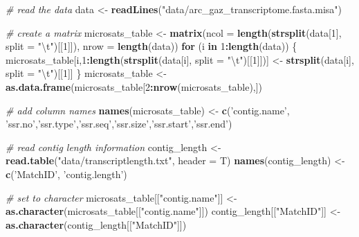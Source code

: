 \documentclass[]{article}
\newenvironment{Shaded}{\begin{snugshade}}{\end{snugshade}}
\newcommand{\KeywordTok}[1]{\textcolor[rgb]{0.13,0.29,0.53}{\textbf{#1}}}
\newcommand{\DataTypeTok}[1]{\textcolor[rgb]{0.13,0.29,0.53}{#1}}
\newcommand{\DecValTok}[1]{\textcolor[rgb]{0.00,0.00,0.81}{#1}}
\newcommand{\CharTok}[1]{\textcolor[rgb]{0.31,0.60,0.02}{#1}}
\newcommand{\StringTok}[1]{\textcolor[rgb]{0.31,0.60,0.02}{#1}}
\newcommand{\CommentTok}[1]{\textcolor[rgb]{0.56,0.35,0.01}{\textit{#1}}}
\newcommand{\ControlFlowTok}[1]{\textcolor[rgb]{0.13,0.29,0.53}{\textbf{#1}}}
\newcommand{\OperatorTok}[1]{\textcolor[rgb]{0.81,0.36,0.00}{\textbf{#1}}}
\newcommand{\NormalTok}[1]{#1}
\begin{document}
\begin{Shaded}
\begin{Highlighting}[]
\CommentTok{# read the data}
\NormalTok{data <-}\StringTok{ }\KeywordTok{readLines}\NormalTok{(}\StringTok{"data/arc_gaz_transcriptome.fasta.misa"}\NormalTok{)}

\CommentTok{# create a matrix}
\NormalTok{microsats_table <-}\StringTok{ }\KeywordTok{matrix}\NormalTok{(}\DataTypeTok{ncol =} \KeywordTok{length}\NormalTok{(}\KeywordTok{strsplit}\NormalTok{(data[}\DecValTok{1}\NormalTok{], }\DataTypeTok{split =} \StringTok{"}\CharTok{\textbackslash{}t}\StringTok{"}\NormalTok{)[[}\DecValTok{1}\NormalTok{]]),}
                          \DataTypeTok{nrow =} \KeywordTok{length}\NormalTok{(data))}
\ControlFlowTok{for}\NormalTok{ (i }\ControlFlowTok{in} \DecValTok{1}\OperatorTok{:}\KeywordTok{length}\NormalTok{(data)) \{}
\NormalTok{microsats_table[i,}\DecValTok{1}\OperatorTok{:}\KeywordTok{length}\NormalTok{(}\KeywordTok{strsplit}\NormalTok{(data[i], }\DataTypeTok{split =} \StringTok{"}\CharTok{\textbackslash{}t}\StringTok{"}\NormalTok{)[[}\DecValTok{1}\NormalTok{]])] <-}\StringTok{ }
\StringTok{  }\KeywordTok{strsplit}\NormalTok{(data[i], }\DataTypeTok{split =} \StringTok{"}\CharTok{\textbackslash{}t}\StringTok{"}\NormalTok{)[[}\DecValTok{1}\NormalTok{]]}
\NormalTok{\}}
\NormalTok{microsats_table <-}\StringTok{ }\KeywordTok{as.data.frame}\NormalTok{(microsats_table[}\DecValTok{2}\OperatorTok{:}\KeywordTok{nrow}\NormalTok{(microsats_table),])}

\CommentTok{# add column names}
\KeywordTok{names}\NormalTok{(microsats_table) <-}
\StringTok{  }\KeywordTok{c}\NormalTok{(}\StringTok{'contig.name'}\NormalTok{, }\StringTok{'ssr.no'}\NormalTok{,}\StringTok{'ssr.type'}\NormalTok{,}\StringTok{'ssr.seq'}\NormalTok{,}\StringTok{'ssr.size'}\NormalTok{,}\StringTok{'ssr.start'}\NormalTok{,}\StringTok{'ssr.end'}\NormalTok{) }

\CommentTok{# read contig length information}
\NormalTok{contig_length <-}\StringTok{ }\KeywordTok{read.table}\NormalTok{(}\StringTok{"data/transcriptlength.txt"}\NormalTok{, }\DataTypeTok{header =}\NormalTok{ T)}
\KeywordTok{names}\NormalTok{(contig_length) <-}\StringTok{ }\KeywordTok{c}\NormalTok{(}\StringTok{'MatchID'}\NormalTok{, }\StringTok{'contig.length'}\NormalTok{)}

\CommentTok{# set to character}
\NormalTok{microsats_table[[}\StringTok{"contig.name"}\NormalTok{]] <-}
\StringTok{  }\KeywordTok{as.character}\NormalTok{(microsats_table[[}\StringTok{"contig.name"}\NormalTok{]])}
\NormalTok{contig_length[[}\StringTok{"MatchID"}\NormalTok{]] <-}
\StringTok{  }\KeywordTok{as.character}\NormalTok{(contig_length[[}\StringTok{"MatchID"}\NormalTok{]])}


\end{Highlighting}
\end{Shaded}
\end{document}
